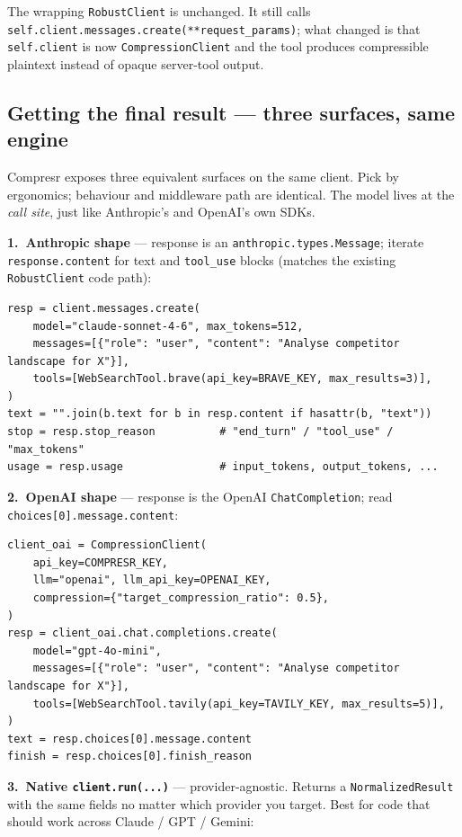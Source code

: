 \documentclass[10pt,a4paper]{article}
\begin{document}
\noindent The wrapping \texttt{RobustClient} is unchanged. It still calls \texttt{self.client.messages.create(**request\_params)}; what changed is that \texttt{self.client} is now \texttt{CompressionClient} and the tool produces compressible plaintext instead of opaque server-tool output.

\subsection{Getting the final result --- three surfaces, same engine}

Compresr exposes three equivalent surfaces on the same client. Pick by ergonomics; behaviour and middleware path are identical. The model lives at the \emph{call site}, just like Anthropic's and OpenAI's own SDKs.

\noindent\textbf{1.\ Anthropic shape} --- response is an \texttt{anthropic.types.Message}; iterate \texttt{response.content} for text and \texttt{tool\_use} blocks (matches the existing \texttt{RobustClient} code path):

\begin{lstlisting}
resp = client.messages.create(
    model="claude-sonnet-4-6", max_tokens=512,
    messages=[{"role": "user", "content": "Analyse competitor landscape for X"}],
    tools=[WebSearchTool.brave(api_key=BRAVE_KEY, max_results=3)],
)
text = "".join(b.text for b in resp.content if hasattr(b, "text"))
stop = resp.stop_reason          # "end_turn" / "tool_use" / "max_tokens"
usage = resp.usage               # input_tokens, output_tokens, ...
\end{lstlisting}

\noindent\textbf{2.\ OpenAI shape} --- response is the OpenAI \texttt{ChatCompletion}; read \texttt{choices[0].message.content}:

\begin{lstlisting}
client_oai = CompressionClient(
    api_key=COMPRESR_KEY,
    llm="openai", llm_api_key=OPENAI_KEY,
    compression={"target_compression_ratio": 0.5},
)
resp = client_oai.chat.completions.create(
    model="gpt-4o-mini",
    messages=[{"role": "user", "content": "Analyse competitor landscape for X"}],
    tools=[WebSearchTool.tavily(api_key=TAVILY_KEY, max_results=5)],
)
text = resp.choices[0].message.content
finish = resp.choices[0].finish_reason
\end{lstlisting}

\noindent\textbf{3.\ Native \texttt{client.run(...)}} --- provider-agnostic. Returns a \texttt{NormalizedResult} with the same fields no matter which provider you target. Best for code that should work across Claude / GPT / Gemini:
\end{document}
